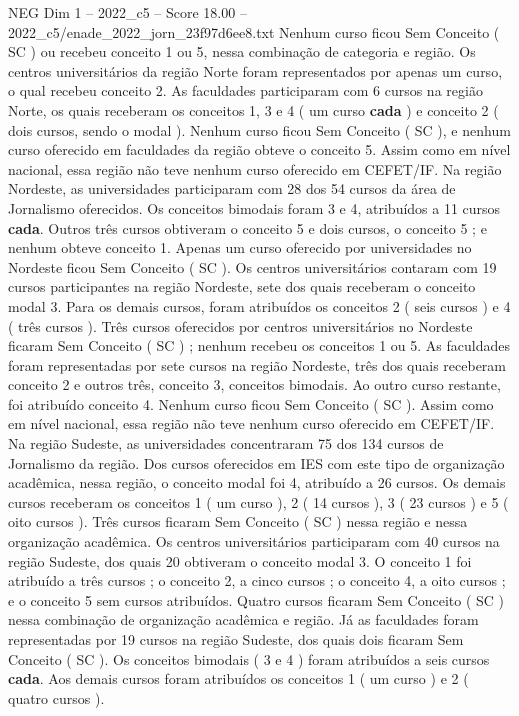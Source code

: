 \begin{textsample}{NEG Dim 1 – 2022\_c5 – Score 18.00 – 2022\_c5/enade\_2022\_jorn\_23f97d6ee8.txt}
Nenhum curso ficou Sem Conceito ( SC ) ou recebeu conceito 1 ou 5, nessa combinação de categoria e região.
Os centros universitários da região Norte foram representados por apenas um curso, o qual recebeu conceito 2.
As faculdades participaram com 6 cursos na região Norte, os quais receberam os conceitos 1, 3 e 4 ( um curso \textbf{cada} ) e conceito 2 ( dois cursos, sendo o modal ).
Nenhum curso ficou Sem Conceito ( SC ), e nenhum curso oferecido em faculdades da região obteve o conceito 5.
Assim como em nível nacional, essa região não teve nenhum curso oferecido em CEFET/IF.
Na região Nordeste, as universidades participaram com 28 dos 54 cursos da área de Jornalismo oferecidos.
Os conceitos bimodais foram 3 e 4, atribuídos a 11 cursos \textbf{cada}.
Outros três cursos obtiveram o conceito 5 e dois cursos, o conceito 5 ; e nenhum obteve conceito 1.
Apenas um curso oferecido por universidades no Nordeste ficou Sem Conceito ( SC ).
Os centros universitários contaram com 19 cursos participantes na região Nordeste, sete dos quais receberam o conceito modal 3.
Para os demais cursos, foram atribuídos os conceitos 2 ( seis cursos ) e 4 ( três cursos ).
Três cursos oferecidos por centros universitários no Nordeste ficaram Sem Conceito ( SC ) ; nenhum recebeu os conceitos 1 ou 5.
As faculdades foram representadas por sete cursos na região Nordeste, três dos quais receberam conceito 2 e outros três, conceito 3, conceitos bimodais.
Ao outro curso restante, foi atribuído conceito 4.
Nenhum curso ficou Sem Conceito ( SC ).
Assim como em nível nacional, essa região não teve nenhum curso oferecido em CEFET/IF.
Na região Sudeste, as universidades concentraram 75 dos 134 cursos de Jornalismo da região.
Dos cursos oferecidos em IES com este tipo de organização acadêmica, nessa região, o conceito modal foi 4, atribuído a 26 cursos.
Os demais cursos receberam os conceitos 1 ( um curso ), 2 ( 14 cursos ), 3 ( 23 cursos ) e 5 ( oito cursos ).
Três cursos ficaram Sem Conceito ( SC ) nessa região e nessa organização acadêmica.
Os centros universitários participaram com 40 cursos na região Sudeste, dos quais 20 obtiveram o conceito modal 3.
O conceito 1 foi atribuído a três cursos ; o conceito 2, a cinco cursos ; o conceito 4, a oito cursos ; e o conceito 5 sem cursos atribuídos.
Quatro cursos ficaram Sem Conceito ( SC ) nessa combinação de organização acadêmica e região.
Já as faculdades foram representadas por 19 cursos na região Sudeste, dos quais dois ficaram Sem Conceito ( SC ).
Os conceitos bimodais ( 3 e 4 ) foram atribuídos a seis cursos \textbf{cada}.
Aos demais cursos foram atribuídos os conceitos 1 ( um curso ) e 2 ( quatro cursos ).

\end{textsample}
